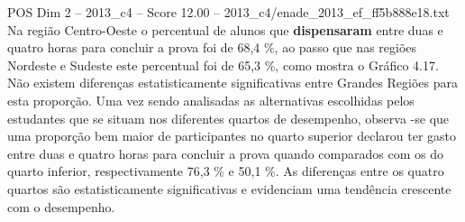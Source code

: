 \begin{textsample}{POS Dim 2 – 2013\_c4 – Score 12.00 – 2013\_c4/enade\_2013\_ef\_ff5b888e18.txt}
Na região Centro-Oeste o percentual de alunos que \textbf{dispensaram} entre duas e quatro horas para concluir a prova foi de 68,4 \%, ao passo que nas regiões Nordeste e Sudeste este percentual foi de 65,3 \%, como mostra o Gráfico 4.17.
Não existem diferenças estatisticamente significativas entre Grandes Regiões para esta proporção.
Uma vez sendo analisadas as alternativas escolhidas pelos estudantes que se situam nos diferentes quartos de desempenho, observa -se que uma proporção bem maior de participantes no quarto superior declarou ter gasto entre duas e quatro horas para concluir a prova quando comparados com os do quarto inferior, respectivamente 76,3 \% e 50,1 \%.
As diferenças entre os quatro quartos são estatisticamente significativas e evidenciam uma tendência crescente com o desempenho.

\end{textsample}
